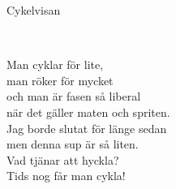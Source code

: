 \begin{song}{Cykelvisan}
	
	
	\\
	
	Man cyklar för lite,\\
	man röker för mycket\\
	och man är fasen så liberal\\
	när det gäller maten och spriten.\\
	Jag borde slutat för länge sedan\\
	men denna sup är så liten.\\
	Vad tjänar att hyckla?\\
	Tids nog får man cykla!
	
\end{song}
